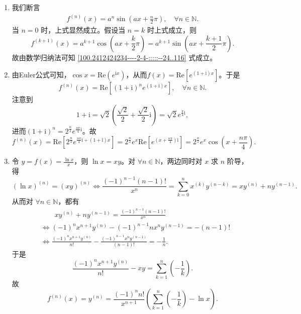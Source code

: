 \documentclass[../../main.tex]{subfiles}
\begin{document}
\begin{solution}
\begin{enumerate}[(1)]
\item 我们断言
\begin{align}\label{100.2412424234----2-4-:::::--24..116}
f^{(n)}(x) = a^n \sin\left(ax + \frac{n}{2}\pi\right), \quad \forall n \in \mathbb{N}. 
\end{align}
当 \( n = 0 \) 时，上式显然成立。假设当 \( n = k \) 时上式成立，则
\[
f^{(k+1)}(x) = a^{k+1} \cos\left(ax + \frac{k}{2}\pi\right) = a^{k+1} \sin\left(ax + \frac{k+1}{2}\pi\right).
\]
故由数学归纳法可知 \eqref{100.2412424234----2-4-:::::--24..116} 式成立。

\item 由Euler公式可知，\(\cos x = \mathrm{Re}(e^{\mathrm{i}x})\)，从而\(f(x) = \mathrm{Re}[e^{(1+\mathrm{i})x}]\)。于是
\[
f^{(n)}(x) = \mathrm{Re}[(1+\mathrm{i})^n e^{(1+\mathrm{i})x}], \quad \forall n \in \mathbb{N}.
\]
注意到
\[
1+\mathrm{i} = \sqrt{2}\left(\frac{\sqrt{2}}{2} + \frac{\sqrt{2}}{2}\mathrm{i}\right) = \sqrt{2}e^{\frac{\pi}{4}\mathrm{i}},
\]
进而\((1+\mathrm{i})^n = 2^{\frac{n}{2}}e^{\frac{n\pi}{4}\mathrm{i}}\)。故
\[
f^{(n)}(x) = \mathrm{Re}\left[2^{\frac{n}{2}}e^{\frac{n\pi}{4}\mathrm{i} + (1+\mathrm{i})x}\right] = 2^{\frac{n}{2}}e^x \mathrm{Re}\left[e^{\left(x + \frac{n\pi}{4}\right)\mathrm{i}}\right] = 2^{\frac{n}{2}}e^x \cos\left(x + \frac{n\pi}{4}\right).
\]

\item 令 \( y = f(x) = \frac{\ln x}{x} \)，则 \( \ln x = xy \)。对 \( \forall n \in \mathbb{N} \)，两边同时对 \( x \) 求 \( n \) 阶导，得
\[
(\ln x)^{(n)} = (xy)^{(n)} \Longleftrightarrow \frac{(-1)^{n - 1}(n - 1)!}{x^n} = \sum_{k=0}^{n} x^{(k)} y^{(n - k)} = xy^{(n)} + n y^{(n - 1)}.
\]
从而对 \( \forall n \in \mathbb{N} \)，都有
\begin{align*}
&\quad \quad xy^{\left( n \right)}+ny^{\left( n-1 \right)}=\frac{\left( -1 \right) ^{n-1}\left( n-1 \right) !}{x^n}
\\
&\Longleftrightarrow \left( -1 \right) ^nx^{n+1}y^{\left( n \right)}-\left( -1 \right) ^{n-1}nx^ny^{\left( n-1 \right)}=-\left( n-1 \right) !
\\
&\Longleftrightarrow \frac{\left( -1 \right) ^nx^{n+1}y^{\left( n \right)}}{n!}-\frac{\left( -1 \right) ^{n-1}x^ny^{\left( n-1 \right)}}{\left( n-1 \right) !}=-\frac{1}{n}.
\end{align*}
于是
\[
\frac{(-1)^n x^{n + 1} y^{(n)}}{n!} - xy = \sum_{k=1}^{n} \left( -\frac{1}{k} \right).
\]
故
\[
f^{(n)}(x) = y^{(n)} = \frac{(-1)^n n!}{x^{n + 1}} \left( \sum_{k=1}^{n} \left( -\frac{1}{k} \right) - \ln x \right).
\]


\end{enumerate}
\end{solution}
\end{document}
